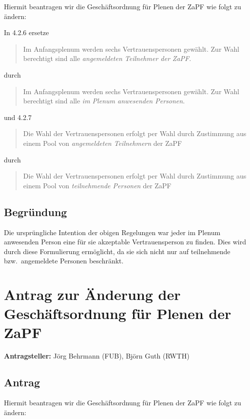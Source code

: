\documentclass[draft,10pt,oneside]{scrartcl}
\begin{document}
Hiermit beantragen wir die Geschäftsordnung für Plenen der ZaPF wie folgt zu
ändern:

In 4.2.6 ersetze
\begin{quote}
  Im Anfangsplenum werden sechs Vertrauenspersonen gewählt. Zur Wahl berechtigt
  sind alle \emph{angemeldeten Teilnehmer der ZaPF}.
\end{quote}
durch
\begin{quote}
  Im Anfangsplenum werden sechs Vertrauenspersonen gewählt. Zur Wahl berechtigt
  sind alle \emph{im Plenum anwesenden Personen}.
\end{quote}
und 4.2.7
\begin{quote}
  Die Wahl der Vertrauenspersonen erfolgt per Wahl durch Zustimmung aus einem
  Pool von \emph{angemeldeten Teilnehmern} der ZaPF
\end{quote}
durch
\begin{quote}
  Die Wahl der Vertrauenspersonen erfolgt per Wahl durch Zustimmung aus einem
  Pool von \emph{teilnehmende Personen} der ZaPF
\end{quote}

\subsection*{Begründung}

Die ursprüngliche Intention der obigen Regelungen war jeder im Plenum anwesenden
Person eine für sie akzeptable Vertrauensperson zu finden. Dies wird durch diese
Formulierung ermöglicht, da sie sich nicht nur auf teilnehmende bzw.\  angemeldete
Personen beschränkt.

\newpage

\section*{Antrag zur Änderung der Geschäftsordnung für Plenen der ZaPF}

\textbf{Antragsteller:} Jörg Behrmann (FUB), Björn Guth (RWTH)

\subsection*{Antrag}

Hiermit beantragen wir die Geschäftsordnung für Plenen der ZaPF wie folgt zu
ändern:
\end{document}
